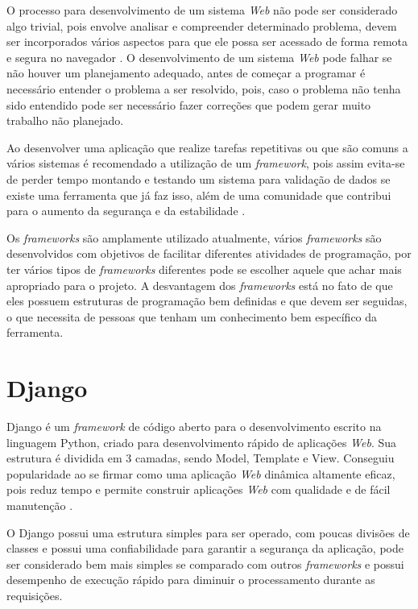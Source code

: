 \documentclass{ifto-tex}
\begin{document}
O processo para desenvolvimento de um sistema \textit{Web} não pode ser considerado algo trivial, pois envolve analisar e compreender determinado problema, devem ser incorporados vários aspectos para que ele possa ser acessado de forma remota e segura no navegador \cite{miletto2014desenvolvimento}. O desenvolvimento de um sistema \textit{Web} pode falhar se não houver um planejamento adequado, antes de começar a programar é necessário entender o problema a ser resolvido, pois, caso o problema não tenha sido entendido pode ser necessário fazer correções que podem gerar muito trabalho não planejado.

Ao desenvolver uma aplicação que realize tarefas repetitivas ou que são comuns a vários sistemas é recomendado a utilização de um \textit{framework}, pois assim evita-se de perder tempo montando e testando um sistema para validação de dados se existe uma ferramenta que já faz isso, além de uma comunidade que contribui para o aumento da segurança e da estabilidade \cite{OqueeumF24:online}.

Os \textit{frameworks} são amplamente utilizado atualmente, vários \textit{frameworks} são desenvolvidos com objetivos de facilitar diferentes atividades de programação, por ter vários tipos de \textit{frameworks} diferentes pode se escolher aquele que achar mais apropriado para o projeto. A desvantagem dos \textit{frameworks} está no fato de que eles possuem estruturas de programação bem definidas e que devem ser seguidas, o que necessita de pessoas que tenham um conhecimento bem específico da ferramenta.


\section{Django}
Django é um \textit{framework} de código aberto para o desenvolvimento escrito na linguagem Python, criado para desenvolvimento rápido de aplicações \textit{Web}.  Sua estrutura é dividida em 3 camadas, sendo Model, Template e View. Conseguiu popularidade ao se firmar como uma aplicação \textit{Web} dinâmica altamente eficaz, pois reduz tempo e permite construir aplicações \textit{Web} com qualidade e de fácil manutenção \cite{badindesenvolvimento}.

O Django possui uma estrutura simples para ser operado, com poucas divisões de classes e possui uma confiabilidade para garantir a segurança da aplicação, pode ser considerado bem mais simples se comparado com outros \textit{frameworks} e possui desempenho de execução rápido para diminuir o processamento durante as requisições.
\end{document}
